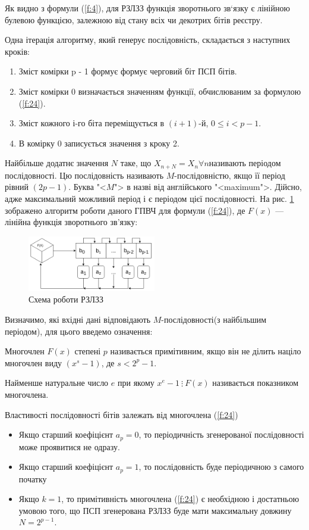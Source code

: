 \documentclass[oneside,final,14pt]{extreport}
\begin{document}
\begin{large}
	Як видно з формули (\ref{f:4}), для РЗЛЗЗ функція зворотнього зв`язку є лінійною
	 булевою функцією, залежною від стану всіх чи декотрих бітів реєстру.

	 Одна ітерація алгоритму, який генерує послідовність, складається з наступних кроків:
\begin{enumerate}
	\item 
Зміст комірки p - 1 формує формує черговий біт ПСП бітів.
	\item
Зміст комірки 0 визначається значенням функції, обчислюваним за формулою (\ref{f:24}).
	\item
Зміст кожного \(і\)-го біта переміщується в \((i+1)\)-й, \(0 \leq i<p-1\).
	\item
В комірку 0 записується значення з кроку 2.
\end{enumerate}

	Найбільше додатнє значення \(N\) таке, що \(X_{n + N}=X_n \forall n\)називають періодом 
	послідовності. Цю послідовність називають \(M\)-послідовністю, якщо її період 
	рівний \((2p-1)\). Буква "<\(M\)"> в назві від англійського "<maximum">. Дійсно, адже 
	максимальний можливий період і є періодом цієї послідовності. 
	На рис. \ref{p:1} зображено алгоритм роботи даного ГПВЧ для формули (\ref{f:24}), де \(F(x)\) ---
	лінійна функція зворотнього зв'язку:
	\begin{figure}[H]
		\centering
		\includegraphics[width=0.5\textwidth]{rzlzz.png}
		\caption{Схема роботи РЗЛЗЗ}
		\label{p:1}
	\end{figure}
Визначимо, які вхідні дані відповідають \(M\)-послідовності(з найбільшим періодом), для цього введемо означення:

Многочлен \(F(x)\) степені \(p\) називається примітивним, якщо він не ділить націло многочлен  виду \((x^s-1)\),  
де \(s < 2^p-1\).

Найменше натуральне число \(e\) при якому \(x^e-1 \: \vdots \: F(x)\) називається показником многочлена.

Властивості послідовності бітів залежать від многочлена (\ref{f:24})
\begin{itemize}
	\item
Якщо старший коефіцієнт \(a_p=0\), то періодичність згенерованої послідовності може проявитися не одразу.
	\item 
Якщо старший коефіцієнт \(a_p=1\), то послідовність буде періодичною з самого початку
	\item
Якщо \(k = 1\), то примітивність многочлена (\ref{f:24}) є необхідною і достатньою умовою того, 
що ПСП згенерована РЗЛЗЗ буде мати максимальну довжину \(N = 2^{p-1}\).
\end{itemize}


\end{large}
\end{document}
